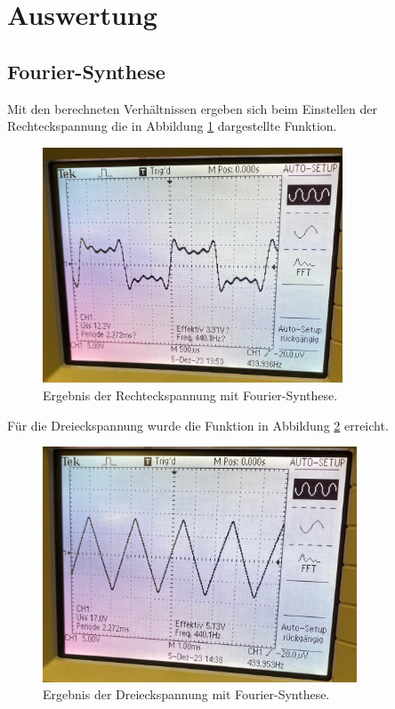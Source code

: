 \section{Auswertung}
\label{sec:Auswertung}
\subsection{Fourier-Synthese}
Mit den berechneten Verhältnissen ergeben sich beim Einstellen der Rechteckspannung die in Abbildung \ref{fig:recht} dargestellte Funktion.

\begin{figure}[H]
  \centering
  \includegraphics[height=7cm]{Bilder/recht.jpg}
  \caption{Ergebnis der Rechteckspannung mit Fourier-Synthese.}
  \label{fig:recht}
\end{figure}

Für die Dreieckspannung wurde die Funktion in Abbildung \ref{fig:drei} erreicht.

\begin{figure}[H]
  \centering
  \includegraphics[height=7cm]{Bilder/drei.jpg}
  \caption{Ergebnis der Dreieckspannung mit Fourier-Synthese.}
  \label{fig:drei}
\end{figure}



